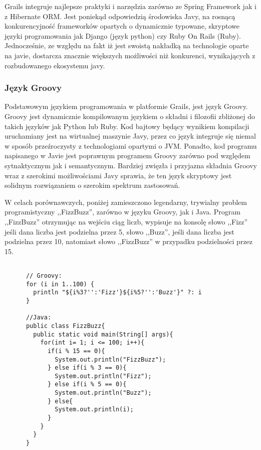    Grails integruje najlepsze praktyki i narzędzia zarówno ze Spring Framework jak i z Hibernate ORM. Jest poniekąd odpowiedzią środowiska Javy, na rosnącą konkurencyjność frameworków opartych o dynamicznie typowane, skryptowe języki programowania jak Django (język python) czy Ruby On Rails (Ruby). Jednocześnie, ze względu na fakt iż jest swoistą nakładką na technologie oparte na javie, dostarcza znacznie większych możliwości niż konkurenci, wynikających z rozbudowanego ekosystemu javy.


    \subsubsection{Język Groovy}

      Podstawowym językiem programowania w platformie Grails, jest język Groovy. Groovy jest dynamicznie kompilowanym językiem o składni i filozofii zbliżonej do takich języków jak Python lub Ruby. Kod bajtowy będący wynikiem kompilacji uruchamiany jest na wirtualnej maszynie Javy, przez co język integruje się niemal w sposób przeźroczysty z technologiami opartymi o JVM. Ponadto, kod programu napisanego w Javie jest poprawnym programem Groovy zarówno pod względem sytnaktycznym jak i semantycznym. Bardziej zwięzła i przyjazna składnia Groovy wraz z szerokimi możliwościami Javy sprawia, że ten język skryptowy jest solidnym rozwiązaniem o szerokim spektrum zastosowań.

      W celach porównawczych, poniżej zamieszczono legendarny, trywialny problem programistyczny ,,FizzBuzz'', zarówno w języku Groovy, jak i Java. Program ,,FizzBuzz'' otrzymując na wejściu ciąg liczb, wypisuje na konsolę słowo ,,Fizz'' jeśli dana liczba jest podzielna przez 5, słowo ,,Buzz'', jeśli dana liczba jest podzielna przez 10, natomiast słowo ,,FizzBuzz'' w przypadku podzielności przez 15.

    \begin{verbatim}

      // Groovy:
      for (i in 1..100) {
        println "${i%3?'':'Fizz'}${i%5?'':'Buzz'}" ?: i
      }    

      //Java:
      public class FizzBuzz{
        public static void main(String[] args){
          for(int i= 1; i <= 100; i++){
            if(i % 15 == 0){
              System.out.println("FizzBuzz");
            } else if(i % 3 == 0){
              System.out.println("Fizz");
            } else if(i % 5 == 0){
              System.out.println("Buzz");
            } else{
              System.out.println(i);
            }
          }
        }
      }

    \end{verbatim}

